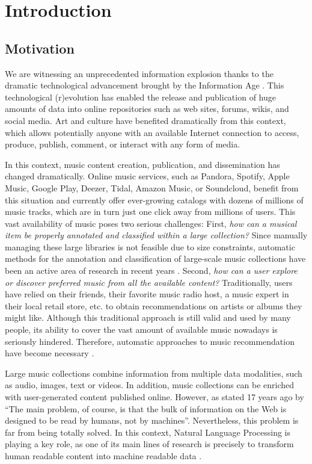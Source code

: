 
\chapter{Introduction}
\label{sec:intro}

\section{Motivation}
\label{sec:intro:motivation}

We are witnessing an unprecedented information explosion thanks to the dramatic technological advancement brought by the Information Age \citep{smith2009social}. This technological (r)evolution has enabled the release and publication of huge amounts of data into online repositories such as web sites, forums, wikis, and social media. Art and culture have benefited dramatically from this context, which allows potentially anyone with an available Internet connection to access, produce, publish, comment, or interact with any form of media. 

In this context, music content creation, publication, and dissemination has changed dramatically. Online music services, such as Pandora, Spotify, Apple Music, Google Play, Deezer, Tidal, Amazon Music, or Soundcloud, benefit from this situation and currently offer ever-growing catalogs with dozens of millions of music tracks, which are in turn just one click away from millions of users. This vast availability of music poses two serious challenges: First, \textit{how can a musical item be properly annotated and classified within a large collection?} Since manually managing these large libraries is not feasible due to size constraints, automatic methods for the annotation and classification of large-scale music collections have been an active area of research in recent years \citep{Schedl2014}. Second, \textit{how can a user explore or discover preferred music from all the available content?} Traditionally, users have relied on their friends, their favorite music radio host, a music expert in their local retail store, etc. to obtain recommendations on artists or albums they might like. Although this traditional approach is still valid and used by many people, its ability to cover the vast amount of available music nowadays is seriously hindered. Therefore, automatic approaches to music recommendation have become necessary \citep{celma2008new}.

Large music collections combine information from multiple data modalities, such as audio, images, text or videos. In addition, music collections can be enriched with user-generated content published online. However, as stated 17 years ago by \cite{Cohen2000} ``The main problem, of course, is that the bulk of information on the Web is designed to be read by humans, not by machines''. Nevertheless, this problem is far from being totally solved. In this context, Natural Language Processing is playing a key role, as one of its main lines of research is precisely to transform human readable content into machine readable data \citep{cowie1996information}. 

